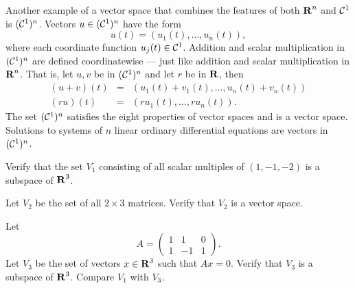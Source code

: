Another example of a vector space that combines the features of
both $\mbox{$\bf{R}$}^n$ and ${\cal C}^1$ is $({\cal C}^1)^n$.  Vectors
$u\in ({\cal C}^1)^n$ have the form
\[
u(t) = (u_1(t),\ldots,u_n(t)),
\]
where each coordinate function $u_j(t)\in{\cal C}^1$.  Addition and
scalar multiplication in $({\cal C}^1)^n$ are defined coordinatewise
--- just like addition and scalar multiplication in $\mbox{$\bf{R}$}^n$.
That is, let $u,v$ be in $({\cal C}^1)^n$ and let $r$ be in $\mbox{$\bf{R}$}$, then
\begin{eqnarray*}
(u+v)(t) & = & (u_1(t)+v_1(t),\ldots,u_n(t)+v_n(t)) \\
(ru)(t) & = & (ru_1(t),\ldots,ru_n(t)).
\end{eqnarray*}
The set $({\cal C}^1)^n$ satisfies the eight properties of vector spaces and
is a vector space.  Solutions to systems of $n$ linear ordinary differential
equations are vectors in $({\cal C}^1)^n$.


\EXER

\TEXER

\begin{exercise} \label{c5.1.1}
Verify that the set $V_1$ consisting of all scalar multiples of
$(1,-1,-2)$ is a subspace of $\mbox{$\bf{R}$}^3$.
\end{exercise}

\begin{exercise} \label{c5.1.2}
Let $V_2$ be the set of all $2\times 3$ matrices.   Verify that
$V_2$ is a vector space.
\end{exercise}

\begin{exercise} \label{c5.1.3}
Let
\[
A=\left(\begin{array}{rrr} 1 & 1 & 0\\ 1 & -1 & 1 \end{array}
\right).
\]
Let $V_3$ be the set of vectors $x\in\mbox{$\bf{R}$}^3$ such that $Ax=0$.
Verify that $V_3$ is a subspace of $\mbox{$\bf{R}$}^3$.  Compare $V_1$ with
$V_3$.
\end{exercise}

